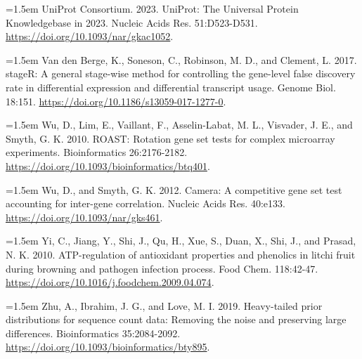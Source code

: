 \documentclass[12pt,letterpaper]{article}
\begin{document}
\noindent\hangindent=1.5em UniProt Consortium. 2023. UniProt: The Universal Protein Knowledgebase in 2023. Nucleic Acids Res. 51:D523-D531. \url{https://doi.org/10.1093/nar/gkac1052}.\par

\noindent\hangindent=1.5em Van den Berge, K., Soneson, C., Robinson, M. D., and Clement, L. 2017. stageR: A general stage-wise method for controlling the gene-level false discovery rate in differential expression and differential transcript usage. Genome Biol. 18:151. \url{https://doi.org/10.1186/s13059-017-1277-0}.\par

\noindent\hangindent=1.5em Wu, D., Lim, E., Vaillant, F., Asselin-Labat, M. L., Visvader, J. E., and Smyth, G. K. 2010. ROAST: Rotation gene set tests for complex microarray experiments. Bioinformatics 26:2176-2182. \url{https://doi.org/10.1093/bioinformatics/btq401}.\par

\noindent\hangindent=1.5em Wu, D., and Smyth, G. K. 2012. Camera: A competitive gene set test accounting for inter-gene correlation. Nucleic Acids Res. 40:e133. \url{https://doi.org/10.1093/nar/gks461}.\par

\noindent\hangindent=1.5em Yi, C., Jiang, Y., Shi, J., Qu, H., Xue, S., Duan, X., Shi, J., and Prasad, N. K. 2010. ATP-regulation of antioxidant properties and phenolics in litchi fruit during browning and pathogen infection process. Food Chem. 118:42-47. \url{https://doi.org/10.1016/j.foodchem.2009.04.074}.\par

\noindent\hangindent=1.5em Zhu, A., Ibrahim, J. G., and Love, M. I. 2019. Heavy-tailed prior distributions for sequence count data: Removing the noise and preserving large differences. Bioinformatics 35:2084-2092. \url{https://doi.org/10.1093/bioinformatics/bty895}.\par
\end{document}
